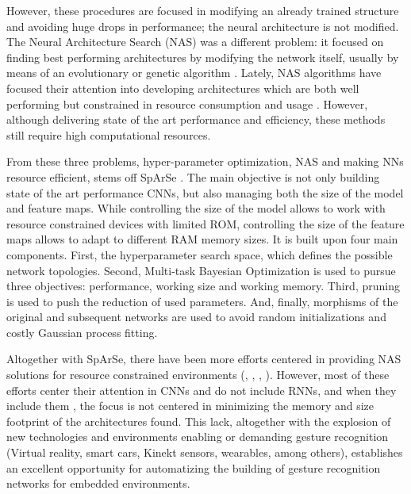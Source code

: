 \documentclass[10pt, a4paper, twocolumn]{article}
\begin{document}
However, these procedures are focused in modifying an already trained structure and avoiding huge drops in performance; the neural architecture is not modified. The Neural Architecture Search (NAS) was a different problem: it focused on finding best performing architectures by modifying the network itself, usually by means of an evolutionary or genetic algorithm \cite{K.O.2002}. Lately, NAS algorithms have focused their attention into developing architectures which are both well performing but constrained in resource consumption and usage \cite{Elsken2018}. However, although delivering state of the art performance and efficiency, these methods still require high computational resources.

From these three problems, hyper-parameter optimization, NAS and making NNs resource efficient, stems off SpArSe \cite{Fedorov2019}. The main objective is not only building state of the art performance CNNs, but also managing both the size of the model and feature maps. While controlling the size of the model allows to work with resource constrained devices with limited ROM, controlling the size of the feature maps allows to adapt to different RAM memory sizes. It is built upon four main components. First, the hyperparameter search space, which defines the possible network topologies. Second, Multi-task Bayesian Optimization is used to pursue three objectives: performance, working size and working memory. Third, pruning is used to push the reduction of used parameters. And, finally, morphisms of the original and subsequent networks are used to avoid random initializations and costly Gaussian process fitting.

Altogether with SpArSe, there have been more efforts centered in providing NAS solutions for resource constrained environments (\cite{Loni2020}, \cite{Cai2019f}, \cite{Li2018n}, \cite{Lu2019}). However, most of these efforts center their attention in CNNs and do not include RNNs, and when they include them \cite{Pham2018}, the focus is not centered in minimizing the memory and size footprint of the architectures found. This lack, altogether with the explosion of new technologies and environments enabling or demanding gesture recognition (Virtual reality, smart cars, Kinekt sensors, wearables, among others), establishes an excellent opportunity for automatizing the building of gesture recognition networks for embedded environments.
\end{document}
